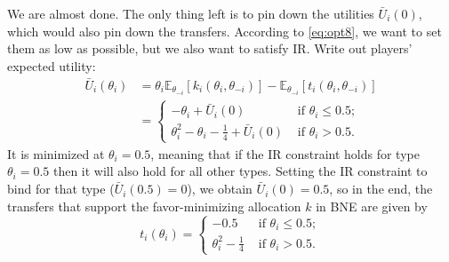 \documentclass[a4paper]{article}
\begin{document}
\begin{enumerate}
	We are almost done. The only thing left is to pin down the utilities $\bar{U}_i(0)$, which would also pin down the transfers. According to \eqref{eq:opt8}, we want to set them as low as possible, but we also want to satisfy IR. Write out players' expected utility:
	\begin{align*}
		\bar{U}_i (\theta_i) &= \theta_i \mathbb{E}_{\theta_{-i}} [k_i(\theta_i,\theta_{-i})] - \mathbb{E}_{\theta_{-i}} [t_i(\theta_i,\theta_{-i})] 
		\\
		&= \begin{cases}
			-\theta_i + \bar{U}_i(0)	& \text{ if } \theta_i \leq 0.5;
			\\
			\theta_i^2 - \theta_i - \frac{1}{4} + \bar{U}_i(0)	& \text{ if } \theta_i > 0.5.
		\end{cases}
	\end{align*}
	It is minimized at $\theta_i=0.5$, meaning that if the IR constraint holds for type $\theta_i=0.5$ then it will also hold for all other types.%
	Setting the IR constraint to bind for that type ($\bar{U}_i(0.5)=0$), we obtain $\bar{U}_i(0) = 0.5$, so in the end, the transfers that support the favor-minimizing allocation $k$ in BNE are given by
	$$t_i(\theta_i) = 
	\begin{cases}
		- 0.5	& \text{ if } \theta_i \leq 0.5;
		\\
		\theta_i^2 - \frac{1}{4}	& \text{ if } \theta_i > 0.5.
	\end{cases}$$
\end{enumerate}
\fi
\end{document}
